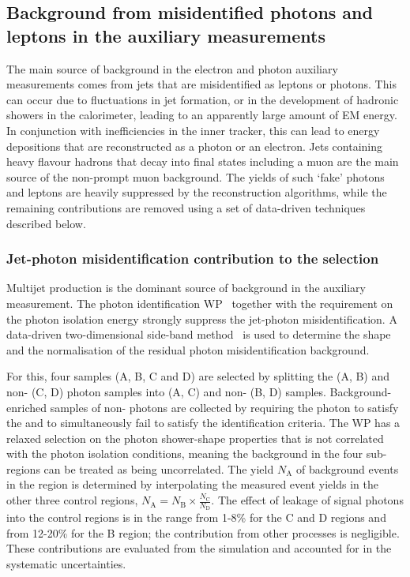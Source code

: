 \documentclass[atlasdraft=false, cernpreprint, UKenglish, texmf, orcidlogo]{atlasdoc}
\begin{document}
\subsection{Background from misidentified photons and leptons in the auxiliary measurements}
\label{sec:fakebkg}
 
 
The main source of background in the electron and photon auxiliary measurements comes from jets that are misidentified as leptons or photons.
This can occur due to fluctuations in jet formation, or in the development of hadronic showers in the calorimeter, leading to an apparently
large amount of EM energy. In conjunction with inefficiencies in the inner tracker, this can lead to energy depositions that
are reconstructed as a photon or an electron.
Jets containing heavy flavour hadrons that decay into final states including a muon are the main source of the non-prompt muon background.
The yields of such `fake' photons and leptons are heavily suppressed by the reconstruction algorithms, while the remaining contributions are removed
using a set of data-driven techniques described below.
 
\subsubsection{Jet-photon misidentification contribution to the \onegjets selection}
\label{sec:fakegamma}
 
Multijet production is the dominant source of background in the \onegjets auxiliary measurement.
The  photon identification WP~\cite{EGAM-2018-01} together with the 
requirement on the photon isolation energy strongly suppress the jet-photon misidentification.
A data-driven two-dimensional side-band method~\cite{STDM-2014-09, STDM-2017-01} is used to determine the shape and the normalisation of the residual
photon misidentification background.
 
For this, four samples (A, B, C and D) are selected by splitting the  (A, B)  and non- (C, D) photon samples
into  (A, C) and non- (B, D) samples.
Background-enriched samples of non- photons are collected by requiring the photon to satisfy the 
and to simultaneously fail to satisfy the  identification criteria.
The  WP has a relaxed selection on the photon shower-shape properties that is not correlated with the photon isolation conditions, meaning
the background in the four sub-regions can be treated as being uncorrelated.
The yield $N_\text{A}$ of background events in the \onegjets region is determined by interpolating the measured event yields in the
other three control regions, \( N_\text{A} = N_\text{B} \times \frac{N_\text{C}}{N_\text{D}} \).
The effect of leakage of signal photons into the control regions is in the range from 1-8\% for
the C and D regions and from 12-20\% for the B region; the contribution from other processes is negligible. These contributions are
evaluated from the simulation and accounted for in the systematic uncertainties.
 
\end{document}
